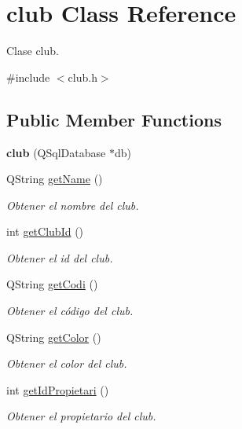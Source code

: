 \hypertarget{classclub}{}\section{club Class Reference}
\label{classclub}


Clase club.  




{\ttfamily \#include $<$club.\+h$>$}

\subsection*{Public Member Functions}
\begin{DoxyCompactItemize}
\item 
\mbox{\label{classclub_a90226b5a0fe26735578eb5174ebd01ca}} 
{\bfseries club} (Q\+Sql\+Database $\ast$db)
\item 
Q\+String \mbox{\hyperlink{classclub_a4a0112cb510ec1e3ec29957f0bb6a873}{get\+Name}} ()
\begin{DoxyCompactList}\small\item\em Obtener el nombre del club. \end{DoxyCompactList}\item 
int \mbox{\hyperlink{classclub_ac6e69f12ebd2a446f942860bf08fd1fa}{get\+Club\+Id}} ()
\begin{DoxyCompactList}\small\item\em Obtener el id del club. \end{DoxyCompactList}\item 
Q\+String \mbox{\hyperlink{classclub_acc2da4046baef9b45398997c1769539a}{get\+Codi}} ()
\begin{DoxyCompactList}\small\item\em Obtener el código del club. \end{DoxyCompactList}\item 
Q\+String \mbox{\hyperlink{classclub_a06ce786578d87f7e15f5372f043f6050}{get\+Color}} ()
\begin{DoxyCompactList}\small\item\em Obtener el color del club. \end{DoxyCompactList}\item 
int \mbox{\hyperlink{classclub_a4f67353b1c96f0d89cc1e9ae2e33ba51}{get\+Id\+Propietari}} ()
\begin{DoxyCompactList}\small\item\em Obtener el propietario del club. \end{DoxyCompactList}\item 

\end{DoxyCompactItemize}
